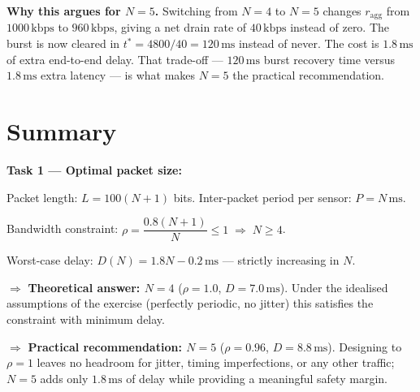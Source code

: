\documentclass[12pt, a4paper]{article}
\begin{document}
\begin{keybox}
\begin{enumerate}[leftmargin=1.6em, itemsep=6pt]
  \end{enumerate}

  \vspace{6pt}
  \textbf{Why this argues for $N = 5$.}
  Switching from $N = 4$ to $N = 5$ changes $r_\text{agg}$ from
  $1000\,\text{kbps}$ to $960\,\text{kbps}$, giving a net drain rate of
  $40\,\text{kbps}$ instead of zero.
  The burst is now cleared in $t^* = 4800/40 = 120\,\text{ms}$ instead of
  never. The cost is $1.8\,\text{ms}$ of extra end-to-end delay.
  That trade-off --- $120\,\text{ms}$ burst recovery time versus
  $1.8\,\text{ms}$ extra latency --- is what makes $N = 5$ the
  practical recommendation.
\end{keybox}

\section*{Summary}

\begin{keybox}
\textbf{Task 1 --- Optimal packet size:}

\vspace{4pt}
Packet length: $L = 100(N+1)$ bits. \quad
Inter-packet period per sensor: $P = N\,\mathrm{ms}$.

\vspace{4pt}
Bandwidth constraint: $\rho = \dfrac{0.8(N+1)}{N} \leq 1 \;\Rightarrow\; N \geq 4$.

\vspace{4pt}
Worst-case delay: $D(N) = 1.8N - 0.2\,\mathrm{ms}$ --- strictly increasing in $N$.

\vspace{4pt}
$\Rightarrow$ \textbf{Theoretical answer: $N = 4$} \; ($\rho = 1.0$, $D = 7.0\,\mathrm{ms}$).
Under the idealised assumptions of the exercise (perfectly periodic, no jitter)
this satisfies the constraint with minimum delay.

\vspace{4pt}
$\Rightarrow$ \textbf{Practical recommendation: $N = 5$} \; ($\rho = 0.96$, $D =
8.8\,\mathrm{ms}$). Designing to $\rho = 1$ leaves no headroom for jitter,
timing imperfections, or any other traffic; $N = 5$ adds only $1.8\,\mathrm{ms}$
of delay while providing a meaningful safety margin.
\end{keybox}
\end{document}
